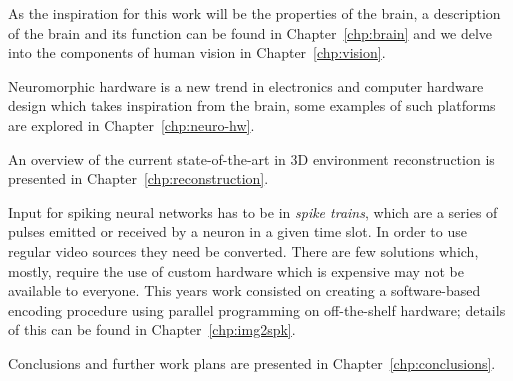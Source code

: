 As the inspiration for this work will be the properties of the brain, a description of the brain and its function can be found in Chapter~\ref{chp:brain} and we delve into the components of human vision in Chapter~\ref{chp:vision}.  

Neuromorphic hardware is a new trend in electronics and computer hardware design which takes inspiration from the brain, some examples of such platforms are explored in Chapter~\ref{chp:neuro-hw}.

An overview of the current state-of-the-art in 3D environment reconstruction is presented in Chapter~\ref{chp:reconstruction}.

Input for spiking neural networks has to be in \emph{spike trains}, which are a series of pulses emitted or received by a neuron in a given time slot. In order to use regular video sources they need be converted. There are few solutions which, mostly, require the use of custom hardware which is expensive may not be available to everyone. This years work consisted on creating a software-based encoding procedure using parallel programming on off-the-shelf hardware; details of this can be found in Chapter~\ref{chp:img2spk}. 

Conclusions and further work plans are presented in Chapter~\ref{chp:conclusions}.